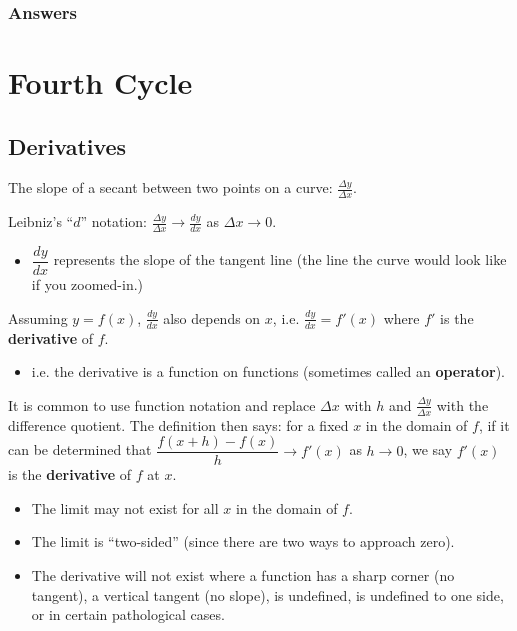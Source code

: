 \documentclass{amsbook}
\numberwithin{section}{chapter}
\numberwithin{equation}{chapter}
\newcommand{\qi}[1]{\begin{itemize}\item #1 \end{itemize}}
\newcommand{\ds}{\displaystyle}
\begin{document}
\subsection*{Answers \nopunct} \hfill
\begin{multicols}{2}
	
\end{multicols}



\chapter{Fourth Cycle}



\section{Derivatives}
\label{derivativeSection}

The slope of a secant between two points on a curve: $\ds \frac{\Delta y}{\Delta x}$.

 Leibniz's ``$d$'' notation: $\ds \frac{\Delta y}{\Delta x} \to \frac{dy}{dx}$ as $\Delta x \to 0$.
 \qi{$\dfrac{dy}{dx}$ represents the slope of the tangent line (the line the curve would look like if you zoomed-in.)}

 Assuming $y=f(x)$, $\ds \frac{dy}{dx}$ also depends on $x$, i.e. $\ds \frac{dy}{dx} = f'(x)$ where $f'$ is the \textbf{derivative} of $f$.
	\qi{i.e. the derivative is a function on functions (sometimes called an \textbf{operator}).}
	

It is common to use function notation and replace $\Delta x$ with $h$ and $\ds \frac{\Delta y}{\Delta x}$ with the difference quotient. The definition then says: for a fixed $x$ in the domain of $f$, if it can be determined that $\dfrac{f(x+h) - f(x)}{h} \to f'(x)$ as $h \to 0$, we say $f'(x)$ is the \textbf{derivative} of $f$ at $x$.
	
	\begin{itemize}
		\item The limit may not exist for all $x$ in the domain of $f$.
		\item {The limit is ``two-sided'' (since there are two ways to approach zero).}
		\item{The derivative will not exist where a function has a sharp corner (no tangent), a vertical tangent (no slope), is undefined, is undefined to one side, or in certain pathological cases.}
	\end{itemize}
\end{document}
